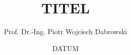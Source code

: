 \usepackage[utf8]{inputenc}
\usepackage[T1]{fontenc}
\usepackage[export]{adjustbox}
\usepackage{amssymb}


\title{TITEL}
\date{DATUM}
\author[PWD]{Prof. Dr.-Ing. Piotr Wojciech Dabrowski}

\usepackage{HTWBeamerTemplate/beamerthemeHTW}
